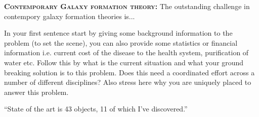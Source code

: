 \smallskip
\smallskip
\noindent
\textbf{\textsc{Contemporary Galaxy formation theory:}}
The outstanding challenge in contempory galaxy formation theories is...

\smallskip
\smallskip
\noindent
In your first sentence start by giving some background information to the problem (to set the scene), you can also provide some statistics or financial information i.e. current cost of the disease to the health system, purification of water etc. Follow this by what is the current situation and what your ground breaking solution is to this problem. Does this need a coordinated effort across a number of different disciplines? Also stress here why you are uniquely placed to answer this problem.

\smallskip
\smallskip
\noindent
``State of the art is 43 objects, 11 of which I've discovered.''

